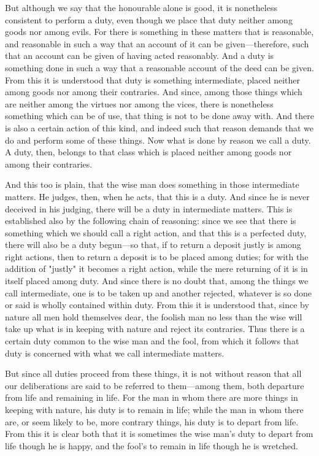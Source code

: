  But although we say that the honourable alone is good, it is nonetheless consistent to perform a duty, even though we place that duty neither among goods nor among evils. For there is something in these matters that is reasonable, and reasonable in such a way that an account of it can be given—therefore, such that an account can be given of having acted reasonably. And a duty is something done in such a way that a reasonable account of the deed can be given. From this it is understood that duty is something intermediate, placed neither among goods nor among their contraries. And since, among those things which are neither among the virtues nor among the vices, there is nonetheless something which can be of use, that thing is not to be done away with. And there is also a certain action of this kind, and indeed such that reason demands that we do and perform some of these things. Now what is done by reason we call a duty. A duty, then, belongs to that class which is placed neither among goods nor among their contraries.

 And this too is plain, that the wise man does something in those intermediate matters. He judges, then, when he acts, that this is a duty. And since he is never deceived in his judging, there will be a duty in intermediate matters. This is established also by the following chain of reasoning: since we see that there is something which we should call a right action, and that this is a perfected duty, there will also be a duty begun—so that, if to return a deposit justly is among right actions, then to return a deposit is to be placed among duties; for with the addition of "justly" it becomes a right action, while the mere returning of it is in itself placed among duty. And since there is no doubt that, among the things we call intermediate, one is to be taken up and another rejected, whatever is so done or said is wholly contained within duty. From this it is understood that, since by nature all men hold themselves dear, the foolish man no less than the wise will take up what is in keeping with nature and reject its contraries. Thus there is a certain duty common to the wise man and the fool, from which it follows that duty is concerned with what we call intermediate matters.

 But since all duties proceed from these things, it is not without reason that all our deliberations are said to be referred to them—among them, both departure from life and remaining in life. For the man in whom there are more things in keeping with nature, his duty is to remain in life; while the man in whom there are, or seem likely to be, more contrary things, his duty is to depart from life. From this it is clear both that it is sometimes the wise man's duty to depart from life though he is happy, and the fool's to remain in life though he is wretched.

